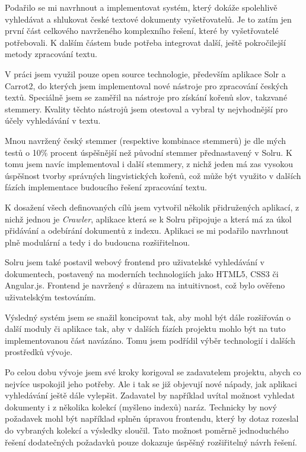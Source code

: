 \begin{conclusion}
Podařilo se mi navrhnout a implementovat systém, který dokáže spolehlivě vyhledávat a shlukovat české textové dokumenty vyšetřovatelů. Je to zatím jen první část celkového navrženého komplexního řešení, které by vyšetřovatelé potřebovali. K dalším částem bude potřeba integrovat další, ještě pokročilejší metody zpracování textu.

V práci jsem využil pouze open source technologie, především aplikace Solr a Carrot2, do kterých jsem implementoval nové nástroje pro zpracování českých textů. Speciálně jsem se zaměřil na nástroje pro získání kořenů slov, takzvané stemmery. Kvality těchto nástrojů jsem otestoval a vybral ty nejvhodnější pro účely vyhledávání v textu. 

Mnou navržený český stemmer (respektive kombinace stemmerů) je dle mých testů o 10\% procent úspěšnější než původní stemmer přednastavený v Solru. K tomu jsem navíc implementoval i další stemmery, z nichž jeden má zas vysokou úspěšnost tvorby správných lingvistických kořenů, což může být využito v dalších fázích implementace budoucího řešení zpracování textu.

K dosažení všech definovaných cílů jsem vytvořil několik přidružených aplikací, z nichž jednou je  \emph{Crawler}, aplikace která se k Solru připojuje a která má za úkol přidávání a odebírání dokumentů z indexu. Aplikaci se mi podařilo navrhnout plně modulární a tedy i do budoucna rozšiřitelnou.

Solru jsem také postavil webový frontend pro uživatelské vyhledávání v dokumentech, postavený na moderních technologiích jako HTML5, CSS3 či Angular.js. Frontend je navržený s důrazem na intuitivnost, což bylo ověřeno uživatelským testováním.

Výsledný systém jsem se snažil koncipovat tak, aby mohl být dále rozšiřován o další moduly či aplikace tak, aby v dalších fázích projektu mohlo být na tuto implementovanou část navázáno. Tomu jsem podřídil výběr technologií i dalších prostředků vývoje.

Po celou dobu vývoje jsem své kroky korigoval se zadavatelem projektu, abych co nejvíce uspokojil jeho potřeby. Ale i tak se již objevují nové nápady, jak aplikaci vyhledávání ještě dále vylepšit. Zadavatel by například uvítal možnost vyhledat dokumenty i z několika kolekcí (myšleno indexů) naráz. Technicky by nový požadavek mohl být například splněn úpravou frontendu, který by dotaz rozeslal do vybraných kolekcí a výsledky sloučil. Tato možnost poměrně jednoduchého řešení dodatečných požadavků pouze dokazuje úspěšný rozšiřitelný návrh řešení.
\end{conclusion}